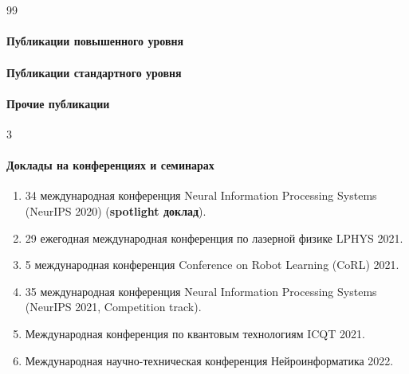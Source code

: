\ifresume 

\section*{}

\expandafter\def\csname blx@maxbibnames\endcsname{99}%
\paragraph{Публикации повышенного уровня} 
\begin{refsection} 
    \nocite{confbib1}
    \printbibliography[heading=none]
\end{refsection}

\paragraph{Публикации стандартного уровня}
\begin{refsection} 
    \nocite{confbib4}
    \printbibliography[heading=none]
\end{refsection}

\paragraph{Прочие публикации}
\begin{refsection} 
    \nocite{confbib2}
    \nocite{confbib3}
    \nocite{progbib1}
    \printbibliography[heading=none]
\end{refsection}

\expandafter\def\csname blx@maxbibnames\endcsname{3}%

\paragraph{Доклады на конференциях и семинарах}
\begin{enumerate}[labelindent=3pt, labelsep=10pt, topsep=10pt, itemsep=5pt]
    \item 34 международная конференция Neural Information Processing Systems (NeurIPS 2020) (\textbf{spotlight доклад}).
    \item 29 ежегодная международная конференция по лазерной физике LPHYS 2021.
    \item 5 международная конференция Conference on Robot Learning (CoRL) 2021.
    \item 35 международная конференция Neural Information Processing Systems (NeurIPS 2021, Competition track).
    \item Международная конференция по квантовым технологиям ICQT 2021.
    \item Международная научно-техническая конференция Нейроинформатика 2022.
\end{enumerate}

